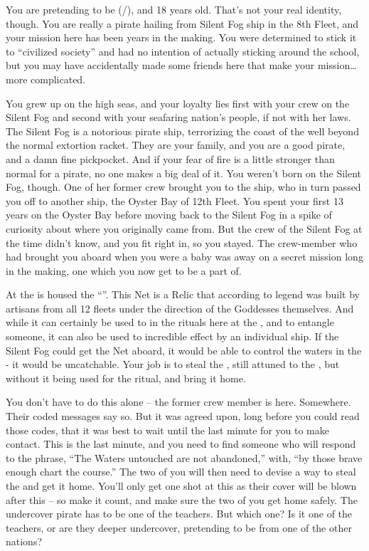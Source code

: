 \documentclass[char]{GL2020}
\begin{document}
\name{\cPirateChild{}}

You are pretending to be \cPirateChild{\full} (\cPirateChild{\they}/\cPirateChild{\them}), and 18 years old. That's not your real identity, though. You are really a \pShippie{} pirate hailing from Silent Fog ship in the 8th Fleet, and your mission here has been years in the making. You were determined to stick it to ``civilized society'' and had no intention of actually sticking around the school, but you may have accidentally made some friends here that make your mission\ldots{} more complicated.

You grew up on the high seas, and your loyalty lies first with your crew on the Silent Fog and second with your seafaring nation's people, if not with her laws. The Silent Fog is a notorious pirate ship, terrorizing the coast of the \pFarm{} well beyond the normal extortion racket. They are your family, and you are a good pirate, and a damn fine pickpocket. And if your fear of fire is a little stronger than normal for a pirate, no one makes a big deal of it. You weren't born on the Silent Fog, though. One of her former crew brought you to the ship, who in turn passed you off to another ship, the Oyster Bay of 12th Fleet. You spent your first 13 years on the Oyster Bay before moving back to the Silent Fog in a spike of curiosity about where you originally came from. But the crew of the Silent Fog at the time didn't know, and you fit right in, so you stayed. The crew-member who had brought you aboard when you were a baby was away on a secret mission long in the making, one which you now get to be a part of.

At the \pSchool{} is housed the ``\iNet{}''. This Net is a Relic that according to legend was built by artisans from all 12 fleets under the direction of the Goddesses themselves. And while it can certainly be used to in the rituals here at the \pSc{}, and to entangle someone, it can also be used to incredible effect by an individual ship. If the Silent Fog could get the Net aboard, it would be able to control the waters in the \pWod{} - it would be uncatchable. Your job is to steal the \iNet{}, still attuned to the \pShip{}, but without it being used for the ritual, and bring it home. 

You don't have to do this alone -- the former crew member is here. Somewhere. Their coded messages say so. But it was agreed upon, long before you could read those codes, that it was best to wait until the last minute for you to make contact. This is the last minute, and you need to find someone who will respond to the phrase, ``The Waters untouched are not abandoned,'' with, ``by those brave enough chart the course.'' The two of you will then need to devise a way to steal the \iNet{} and get it home. You'll only get one shot at this as their cover will be blown after this – so make it count, and make sure the two of you get home safely. The undercover pirate has to be one of the teachers. But which one? Is it one of the \pShip{} teachers, or are they deeper undercover, pretending to be from one of the other nations?
\end{document}
